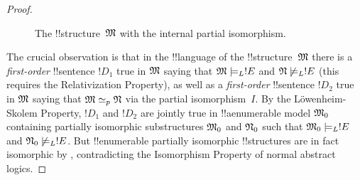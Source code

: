 \documentclass[../../../include/open-logic-section]{subfiles}
\begin{document}
\begin{proof}
\begin{figure}[h]
  \centering
  \caption{The !!{structure}~$\Struct{M}$ with the internal
    partial isomorphism.}
\end{figure}

The crucial observation is that in the !!{language} of the
!!{structure}~$\Struct{M}$ there is a \emph{first-order} !!{sentence} $!D_1$
true in $\Struct{M}$ saying that $\Struct{M} \models_L !E$ and
$\Struct{N} \not\models_L !E$ (this requires the Relativization
Property), as well as a \emph{first-order} !!{sentence} $!D_2$ true in
$\Struct{M}$ saying that $\Struct{M} \simeq_p \Struct{N}$ via the
partial isomorphism~$I$. By the L\"owenheim-Skolem Property, $!D_1$
and $!D_2$ are jointly true in !!a{enumerable} model $\Struct{M}_0$
containing partially isomorphic substructures $\Struct{M}_0$ and
$\Struct{N}_0$ such that $\Struct{M}_0 \models_L !E$ and $\Struct{N}_0
\not\models_L !E$. But !!{enumerable} partially isomorphic !!{structure}s are
in fact isomorphic by , contradicting the
Isomorphism Property of normal abstract logics.
\end{proof}
\end{document}
